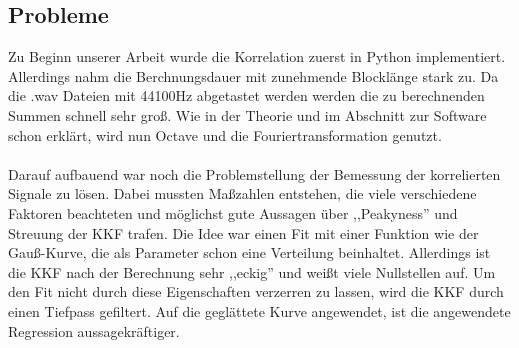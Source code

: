 \subsection{Probleme} 
Zu Beginn unserer Arbeit wurde die Korrelation zuerst in Python implementiert. Allerdings nahm die Berchnungsdauer mit zunehmende Blocklänge stark zu. Da die .wav Dateien mit 44100Hz abgetastet werden werden die zu berechnenden Summen schnell sehr groß. Wie in der Theorie und im Abschnitt zur Software schon erklärt, wird nun Octave und die Fouriertransformation genutzt. \\\\Darauf aufbauend war noch die Problemstellung der Bemessung der korrelierten Signale zu lösen. Dabei mussten Maßzahlen entstehen, die viele verschiedene Faktoren beachteten und möglichst gute Aussagen über ,,Peakyness'' und Streuung der KKF trafen. Die Idee war einen Fit mit einer Funktion wie der Gauß-Kurve, die als Parameter schon eine Verteilung beinhaltet. Allerdings ist die KKF nach der Berechnung sehr ,,eckig'' und weißt viele Nullstellen auf. Um den Fit nicht durch diese Eigenschaften verzerren zu lassen, wird die KKF durch einen Tiefpass gefiltert. Auf die geglättete Kurve angewendet, ist die angewendete Regression aussagekräftiger.
